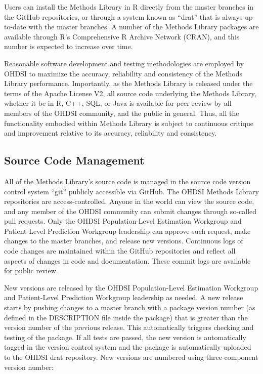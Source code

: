 \documentclass[11pt]{book}
\theoremstyle{definition}
\theoremstyle{definition}
\theoremstyle{definition}
\theoremstyle{remark}
\begin{document}
Users can install the Methods Library in R directly from the master branches in the GitHub repositories, or through a system known as ``drat'' that is always up-to-date with the master branches. A number of the Methods Library packages are available through R's Comprehensive R Archive Network (CRAN), and this number is expected to increase over time.

Reasonable software development and testing methodologies are employed by OHDSI to maximize the accuracy, reliability and consistency of the Methods Library performance. Importantly, as the Methods Library is released under the terms of the Apache License V2, all source code underlying the Methods Library, whether it be in R, C++, SQL, or Java is available for peer review by all members of the OHDSI community, and the public in general. Thus, all the functionality embodied within Methods Library is subject to continuous critique and improvement relative to its accuracy, reliability and consistency.

\hypertarget{source-code-management}{%
\subsection{Source Code Management}\label{source-code-management}}

All of the Methods Library's source code is managed in the source code version control system ``git'' publicly accessible via GitHub. The OHDSI Methods Library repositories are access-controlled. Anyone in the world can view the source code, and any member of the OHDSI community can submit changes through so-called pull requests. Only the OHDSI Population-Level Estimation Workgroup and Patient-Level Prediction Workgroup leadership can approve such request, make changes to the master branches, and release new versions. Continuous logs of code changes are maintained within the GitHub repositories and reflect all aspects of changes in code and documentation. These commit logs are available for public review.

New versions are released by the OHDSI Population-Level Estimation Workgroup and Patient-Level Prediction Workgroup leadership as needed. A new release starts by pushing changes to a master branch with a package version number (as defined in the DESCRIPTION file inside the package) that is greater than the version number of the previous release. This automatically triggers checking and testing of the package. If all tests are passed, the new version is automatically tagged in the version control system and the package is automatically uploaded to the OHDSI drat repository. New versions are numbered using three-component version number:
\end{document}
